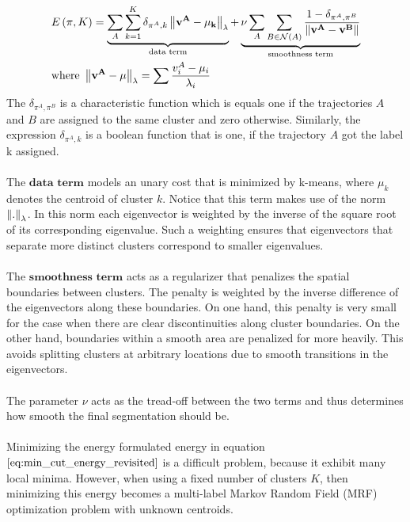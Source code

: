 \begin{equation}
\begin{aligned}
& E \left( \pi, K \right) = \underbrace{\sum_{A} \sum_{k=1}^K \delta_{\pi^A, k} \left\lVert\bf{v}^A - \mu_k\right\rVert_{\lambda}}_\text{data term} + \underbrace{\nu \sum_A \sum_{B \in \mathcal{N}(A)} \frac{1- \delta_{\pi^A, \pi^B}}{\left\lVert\bf{v}^A - \bf{v}^B\right\rVert}}_\text{smoothness term} \\
& \text{where } \left\lVert\bf{v}^A - \bf{\mu}\right\rVert_\lambda = \sum \frac{v_i^A -  \mu_i}{\lambda_i}
\end{aligned} 
\label{eq:min_cut_energy_revisited}
\end{equation}
The $\delta_{\pi^A, \pi^B}$ is a characteristic function which is equals one if the trajectories $A$ and $B$ are assigned to the same cluster and zero otherwise. Similarly, the expression $\delta_{\pi^A, k}$ is a boolean function that is one, if the trajectory $A$ got the label k assigned. \\ \\
The $\textbf{data term}$ models an unary cost that is minimized by k-means, where $\mu_k$ denotes the centroid of cluster $k$. Notice that this term makes use of the norm $\left\lVert.\right\rVert_{\lambda}$. In this norm each eigenvector is weighted by the inverse of the square root of its corresponding eigenvalue. Such a weighting ensures that eigenvectors that separate more distinct clusters correspond to smaller eigenvalues. \\ \\
The $\textbf{smoothness term}$ acts as a regularizer that penalizes the spatial boundaries between clusters. The penalty is weighted by the inverse difference of the eigenvectors along these boundaries. On one hand, this penalty is very small for the case when there are clear discontinuities along cluster boundaries. On the other hand, boundaries within a smooth area are penalized for more heavily. This avoids splitting clusters at arbitrary locations due to smooth transitions in the eigenvectors. \\ \\
The parameter $\nu$ acts as the tread-off between the two terms and thus determines how smooth the final segmentation should be. \\ \\
Minimizing the energy formulated energy in equation $\ref{eq:min_cut_energy_revisited}$ is a difficult problem, because it exhibit many local minima. However, when using a fixed number of clusters $K$, then minimizing this energy becomes a multi-label Markov Random Field (MRF) optimization problem with unknown centroids.

